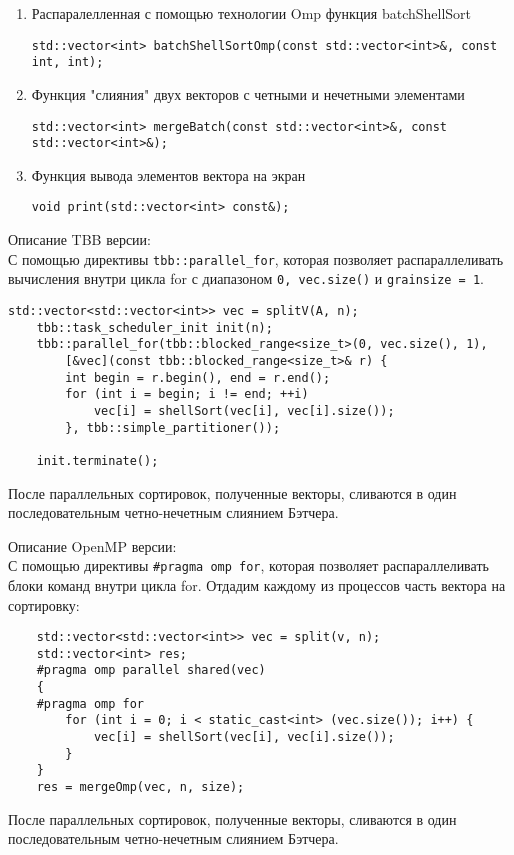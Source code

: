 \documentclass{report}
\begin{document}
\begin{enumerate}
\item Распаралелленная с помощью технологии Omp функция batchShellSort
\begin{lstlisting}
std::vector<int> batchShellSortOmp(const std::vector<int>&, const int, int);
\end{lstlisting}
\item Функция "слияния" двух векторов с четными и нечетными элементами
\begin{lstlisting}
std::vector<int> mergeBatch(const std::vector<int>&, const std::vector<int>&);
\end{lstlisting}
\item Функция вывода элементов вектора на экран
\begin{lstlisting}
void print(std::vector<int> const&);
\end{lstlisting}
\end{enumerate}
\par Описание TBB версии:
\\С помощью директивы \verb|tbb::parallel_for|, которая позволяет распараллеливать вычисления внутри цикла for с диапазоном \verb|0, vec.size()| и \verb|grainsize = 1|.  
\begin{lstlisting}
std::vector<std::vector<int>> vec = splitV(A, n);
    tbb::task_scheduler_init init(n);
    tbb::parallel_for(tbb::blocked_range<size_t>(0, vec.size(), 1),
        [&vec](const tbb::blocked_range<size_t>& r) {
        int begin = r.begin(), end = r.end();
        for (int i = begin; i != end; ++i)
            vec[i] = shellSort(vec[i], vec[i].size());
        }, tbb::simple_partitioner());

    init.terminate();
\end{lstlisting}
После параллельных сортировок, полученные векторы, сливаются в один последовательным четно-нечетным слиянием Бэтчера.
\par Описание OpenMP версии:
\\С помощью директивы \verb|#pragma omp for|, которая позволяет распараллеливать блоки команд внутри цикла for. Отдадим каждому из процессов часть вектора на сортировку: 
\begin{lstlisting}
    std::vector<std::vector<int>> vec = split(v, n);
    std::vector<int> res;
    #pragma omp parallel shared(vec)
    {
    #pragma omp for
        for (int i = 0; i < static_cast<int> (vec.size()); i++) {
            vec[i] = shellSort(vec[i], vec[i].size());
        }
    }
    res = mergeOmp(vec, n, size);
\end{lstlisting}
После параллельных сортировок, полученные векторы, сливаются в один последовательным четно-нечетным слиянием Бэтчера.
\end{document}
